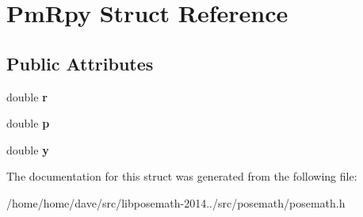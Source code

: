 \hypertarget{structPmRpy}{}\section{Pm\+Rpy Struct Reference}
\label{structPmRpy}
\subsection*{Public Attributes}
\begin{DoxyCompactItemize}
\item 
\hypertarget{structPmRpy_ad7a7492e7d738eeead795f7447e29fcc}{}double {\bfseries r}\label{structPmRpy_ad7a7492e7d738eeead795f7447e29fcc}

\item 
\hypertarget{structPmRpy_a23b81486467f530713155cbd67ffc7c9}{}double {\bfseries p}\label{structPmRpy_a23b81486467f530713155cbd67ffc7c9}

\item 
\hypertarget{structPmRpy_a64dbc66f55c70e322a8488145e21c8c9}{}double {\bfseries y}\label{structPmRpy_a64dbc66f55c70e322a8488145e21c8c9}

\end{DoxyCompactItemize}


The documentation for this struct was generated from the following file\+:\begin{DoxyCompactItemize}
\item 
/home/home/dave/src/libposemath-\/2014../src/posemath/posemath.\+h\end{DoxyCompactItemize}
